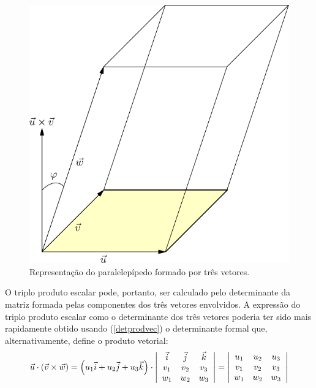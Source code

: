 \begin{figure}%
   \includegraphics{./cap_algvet/pics/volume_determinante}
   \caption{Representação do paralelepípedo formado por três vetores.}\label{fig:volume_determinante}   
  \end{figure}
O triplo produto escalar pode, portanto, ser calculado pelo determinante da matriz formada pelas componentes dos três vetores envolvidos. A expressão do triplo produto escalar como o determinante dos três vetores poderia ter sido mais rapidamente obtido usando (\ref{detprodvec}) o determinante formal que, alternativamente, define o produto vetorial:
\begin{equation}
\vec{u}\cdot (\vec{v}\times \vec{w})
=\left(u_1\vec{i}+u_2\vec{j}+u_3\vec{k}\right)\cdot\left|\begin{array}{ccc}
\vec{i}&\vec{j}&\vec{k}\\
v_1 & v_2 & v_3\\
w_1 & w_2 & w_3\\
\end{array}
\right|=\left|\begin{array}{ccc}
	  u_1&u_2&u_3\\
	  v_1&v_2&v_3\\
	  w_1&w_2&w_3
       \end{array}
 \right|
\end{equation}



